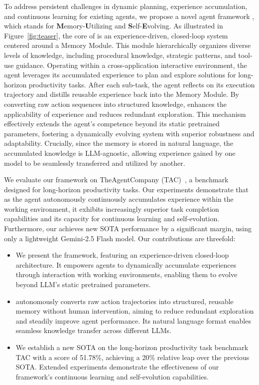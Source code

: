 To address persistent challenges in dynamic planning, experience accumulation, and continuous learning for existing agents, we propose a novel agent framework \textbf{\method}, which stands for \textbf{M}emory-\textbf{U}tilizing and \textbf{S}elf-\textbf{E}volving. As illustrated in Figure~\ref{fig:teaser}, the core of {\method} is an experience-driven, closed-loop system centered around a Memory Module. This module hierarchically organizes diverse levels of knowledge, including procedural knowledge, strategic patterns, and tool-use guidance. Operating within a cross-application interactive environment, the agent leverages its accumulated experience to plan and explore solutions for long-horizon productivity tasks. After each sub-task, the agent reflects on its execution trajectory and distills reusable experience back into the Memory Module.
By converting raw action sequences into structured knowledge, {\method} enhances the applicability of experience and reduces redundant exploration. 
This mechanism effectively extends the agent's competence beyond its static pretrained parameters, fostering a dynamically evolving system with superior robustness and adaptability. Crucially, since the memory is stored in natural language, the accumulated knowledge is LLM-agnostic, allowing experience gained by one model to be seamlessly transferred and utilized by another.


We evaluate our framework on TheAgentCompany (TAC)~\citep{xu2024theagentcompanybenchmarkingllmagents}, a benchmark designed for long-horizon productivity tasks. Our experiments demonstrate that as the agent autonomously continuously accumulates experience within the working environment, it exhibits increasingly superior task completion capabilities and its capacity for continuous learning and self-evolution. Furthermore, our {\method} achieves new SOTA performance by a significant margin, using only a lightweight Gemini-2.5 Flash model. Our contributions are threefold:

\begin{itemize}

    \item We present the {\method} framework, featuring an experience-driven closed-loop architecture. It empowers agents to dynamically accumulate experiences through interaction with working environments, enabling them to evolve beyond LLM's static pretrained parameters.
    
    \item {\method} autonomously converts raw action trajectories into structured, reusable memory without human intervention, aiming to reduce redundant exploration and steadily improve agent performance. Its natural language format enables seamless knowledge transfer across different LLMs.

    \item We establish a new SOTA on the long-horizon productivity task benchmark TAC with a score of 51.78\%, achieving a 20\% relative leap over the previous SOTA. Extended experiments demonstrate the effectiveness of our framework's continuous learning and self-evolution capabilities.
    
\end{itemize}



